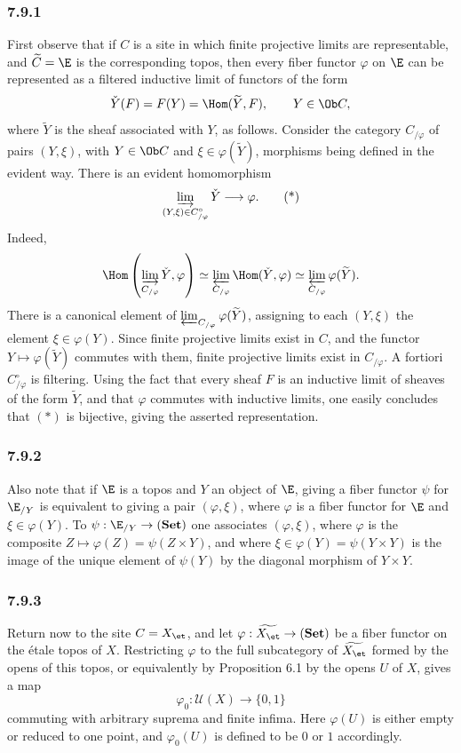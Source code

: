 \subsubsection*{7.9.1}
First observe that if \(C\) is a site in which finite projective limits are representable, and \(\widetilde C=\E\) is the corresponding topos, then every fiber functor \(\varphi\) on \(\E\) can be represented as a filtered inductive limit of functors of the form
\[
\check Y(F)=F(Y)=\Hom(\widetilde Y,F),\qquad Y\in\Ob C,
\]
where \(\widetilde Y\) is the sheaf associated with \(Y\), as follows. Consider the category \(C_{/\varphi}\) of pairs \((Y,\xi)\), with \(Y\in\Ob C\) and \(\xi\in\varphi(\widetilde Y)\), morphisms being defined in the evident way. There is an evident homomorphism
\[
\varinjlim_{(Y,\xi)\in C_{/\varphi}^\circ}\check Y\longrightarrow\varphi.
\tag{*}
\]
Indeed,
\[
\Hom\left(\varinjlim_{C_{/\varphi}}\check Y,\varphi\right)
\simeq \varprojlim_{C_{/\varphi}}\Hom(\check Y,\varphi)
\simeq \varprojlim_{C_{/\varphi}}\varphi(\widetilde Y).
\]
There is a canonical element of \(\varprojlim_{C_{/\varphi}}\varphi(\widetilde Y)\), assigning to each \((Y,\xi)\) the element \(\xi\in\varphi(Y)\). Since finite projective limits exist in \(C\), and the functor \(Y\mapsto\varphi(\widetilde Y)\) commutes with them, finite projective limits exist in \(C_{/\varphi}\). A fortiori \(C_{/\varphi}^\circ\) is filtering. Using the fact that every sheaf \(F\) is an inductive limit of sheaves of the form \(\widetilde Y\), and that \(\varphi\) commutes with inductive limits, one easily concludes that \((*)\) is bijective, giving the asserted representation.

\subsubsection*{7.9.2}
Also note that if \(\E\) is a topos and \(Y\) an object of \(\E\), giving a fiber functor \(\psi\) for \(\E_{/Y}\) is equivalent to giving a pair \((\varphi,\xi)\), where \(\varphi\) is a fiber functor for \(\E\) and \(\xi\in\varphi(Y)\). To \(\psi:\E_{/Y}\to(\mathbf{Set})\) one associates \((\varphi,\xi)\), where \(\varphi\) is the composite \(Z\mapsto\varphi(Z)=\psi(Z\times Y)\), and where \(\xi\in\varphi(Y)=\psi(Y\times Y)\) is the image of the unique element of \(\psi(Y)\) by the diagonal morphism of \(Y\times Y\).

\subsubsection*{7.9.3}
Return now to the site \(C=X_{\et}\), and let \(\varphi:\widetilde{X_{\et}}\to(\mathbf{Set})\) be a fiber functor on the \'etale topos of \(X\). Restricting \(\varphi\) to the full subcategory of \(\widetilde{X_{\et}}\) formed by the opens of this topos, or equivalently by Proposition 6.1 by the opens \(U\) of \(X\), gives a map
\[
\varphi_0:\mathcal U(X)\longrightarrow\{0,1\}
\]
commuting with arbitrary suprema and finite infima. Here \(\varphi(U)\) is either empty or reduced to one point, and \(\varphi_0(U)\) is defined to be \(0\) or \(1\) accordingly.

